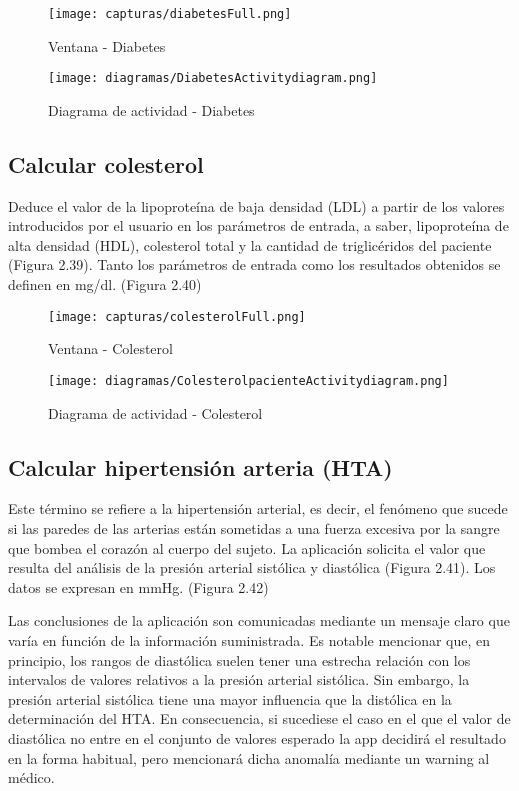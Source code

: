 \documentclass[11pt,spanish,
		listoftables,listoffigures]
		{tfgplantilla}
\begin{document}
\begin{figure}[H]
\centering
\texttt{[image: capturas/diabetesFull.png]}
\caption{Ventana - Diabetes}
\end{figure}

\begin{figure}[H]
\centering
\texttt{[image: diagramas/DiabetesActivitydiagram.png]}
\caption{Diagrama de actividad - Diabetes}
\end{figure}

\subsection {Calcular colesterol}

Deduce el valor de la lipoproteína de baja densidad (LDL) a partir de los valores introducidos por el usuario en los parámetros de entrada, a saber, lipoproteína de alta densidad (HDL), colesterol total y la cantidad de triglicéridos del paciente (Figura 2.39).
Tanto los parámetros de entrada como los resultados obtenidos se definen en mg/dl. (Figura 2.40)

\begin{figure}[H]
\centering
\texttt{[image: capturas/colesterolFull.png]}
\caption{Ventana - Colesterol}
\end{figure}

\begin{figure}[H]
\centering
\texttt{[image: diagramas/ColesterolpacienteActivitydiagram.png]}
\caption{Diagrama de actividad - Colesterol}
\end{figure}

\subsection {Calcular hipertensión arteria (HTA)}

Este término se refiere a la hipertensión arterial, es decir, el fenómeno que sucede si las paredes de las arterias están sometidas a una fuerza excesiva por la sangre que bombea el corazón al cuerpo del sujeto.
La aplicación solicita el valor que resulta del análisis de la presión arterial sistólica y diastólica (Figura 2.41). Los datos se expresan en mmHg. (Figura 2.42)

Las conclusiones de la aplicación son comunicadas mediante un mensaje claro que varía en función de la información suministrada.
Es notable mencionar que, en principio, los rangos de diastólica suelen tener una estrecha relación con los intervalos de valores relativos a la presión arterial sistólica. Sin embargo, la presión arterial sistólica tiene una mayor influencia que la distólica en la determinación del HTA. En consecuencia, si sucediese el caso en el que el valor de diastólica no entre en el conjunto de valores esperado la app decidirá el resultado en la forma habitual, pero mencionará dicha anomalía mediante un warning al médico.
\end{document}
